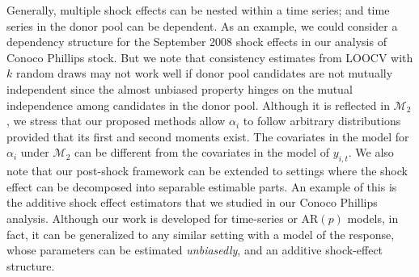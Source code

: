 \documentclass[11pt]{article}
\def\mc#1{\mathcal{#1}} %
\theoremstyle{definition}
\begin{document}
Generally, multiple shock effects can be nested within a time series; and time series in the donor pool can be dependent. As an example, we could consider a dependency structure for the September 2008 shock effects in our analysis of Conoco Phillips stock. But we note that consistency estimates from LOOCV with $k$ random draws may not work well if donor pool candidates are not mutually independent since the almost unbiased property hinges on the mutual independence among candidates in the donor pool.
Although it is reflected in $\mc{M}_2$, we stress that our proposed methods allow $\alpha_i$ to follow arbitrary distributions provided that its first and second moments exist. The covariates in the model for $\alpha_i$ under $\mc{M}_2$ can be different from the covariates in the model of $y_{i,t}$.  We also note that our post-shock framework can be extended to settings where the shock effect can be decomposed into separable estimable parts. An example of this is the additive shock effect estimators that we studied in our Conoco Phillips analysis. Although our work is developed for  time-series or AR$(p)$ models, in fact, it can be generalized to any similar setting with a model of the response, whose parameters can be estimated \emph{unbiasedly}, and an additive shock-effect structure.
\end{document}
